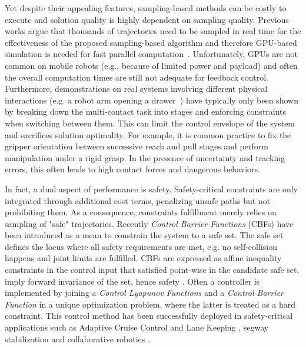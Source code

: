 Yet despite their appealing features, sampling-based methods can be costly to execute and solution quality is highly dependent on sampling quality. Previous works argue that thousands of trajectories need to be sampled in real time for the effectiveness of the proposed sampling-based algorithm and therefore GPU-based simulation is needed for fast parallel computation~\cite{williams_model_2017}. 
Unfortunately, GPUs are not common on mobile robots (e.g., because of limited power and payload) and often the overall computation times are still not adequate for feedback control. 
Furthermore, demonstrations on real systems involving different physical interactions (e.g. a robot arm opening a drawer~\cite{abraham_model-based_2020}) have typically only been shown by breaking down the multi-contact task into stages and enforcing constraints when switching between them. 
This can limit the control envelope of the system and sacrifices solution optimality. For example, it is common practice to fix the gripper orientation between successive reach and pull stages and perform manipulation under a rigid grasp. In the presence of uncertainty and tracking errors, this often leads to high contact forces and dangerous behaviors.

In fact, a dual aspect of performance is safety. Safety-critical constraints are only integrated through additional cost terms, penalizing unsafe paths but not prohibiting them. As a consequence, constraints fulfillment merely relies on sampling of "safe" trajectories. 
Recently \emph{Control Barrier Functions} (CBFs) have been introduced as a mean to constrain the system to a safe set. The safe set defines the locus where all safety requirements are met, e.g. no self-collision happens and joint limits are fulfilled. CBFs are expressed as affine inequality constraints in the control input that satisfied point-wise in the candidate safe set, imply forward invariance of the set, hence safety \cite{ames2016control}.  Often a controller is implemented by joining a \emph{Control Lyapunov Functions} and a \emph{Control Barrier Function} in a unique optimization problem, where the latter is treated as a hard constraint. This control method has been successfully deployed in safety-critical applications such as Adaptive Cruise Control and Lane Keeping \cite{vahidi2003research}, segway stabilization \cite{gurriet2018towards} and collaborative robotics \cite{benzi2021optimization}.

